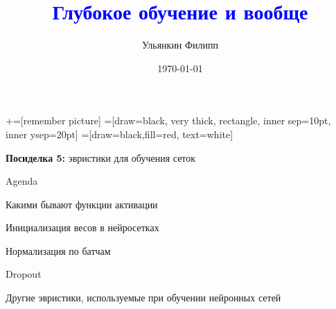 \documentclass[notes,12pt, aspectratio=169]{beamer}
\title[]{\textcolor{blue}{Глубокое обучение и вообще}}
\author{Ульянкин Филипп}
\date{\today}
\newenvironment{wideitemize}{\itemize\addtolength{\itemsep}{10pt}}{\enditemize}
\begin{document}
\newcommand\marktopleft[1]{%
    \tikz[overlay,remember picture] 
        \node (marker-#1-a) at (-.3em,.3em) {};%
}
\newcommand\markbottomright[2]{%
    \tikz[overlay,remember picture] 
        \node (marker-#1-b) at (0em,0em) {};%
}
+=[remember picture] 
 =[draw=black, very thick, rectangle, inner sep=10pt, inner ysep=20pt]
 =[draw=black,fill=red, text=white]



\begin{frame}
\maketitle
\centering \textbf{\color{blue} Посиделка 5:}  эвристики для обучения сеток
\end{frame}


\begin{frame}{Agenda}
\begin{wideitemize}
	\item  Какими бывают функции активации 
	\item  Инициализация весов в нейросетках 
	\item  Нормализация по батчам 
	\item  Dropout 
	\item  Другие эвристики, используемые при обучении нейронных сетей 
\end{wideitemize} 
\end{frame}
\end{document}
